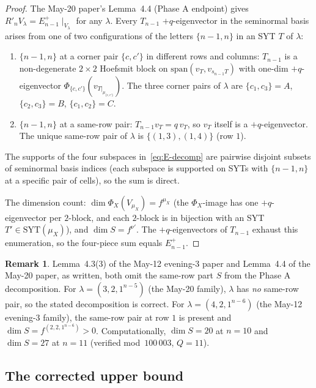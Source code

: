 \documentclass[11pt]{article}
\theoremstyle{definition}
\newtheorem{remark}[theorem]{Remark}
\begin{document}
\begin{proof}
The May-20 paper's Lemma~4.4 (Phase A endpoint) gives $R'_n V_\lambda
= E_{n-1}^+\!\mid_{V_\lambda}$ for any $\lambda$. Every $T_{n-1}$
$+q$-eigenvector in the seminormal basis arises from one of two
configurations of the letters $\{n - 1, n\}$ in an SYT $T$ of
$\lambda$:
\begin{enumerate}[label=(\arabic*),topsep=0.2em,itemsep=0.1em]
\item $\{n - 1, n\}$ at a corner pair $\{c, c'\}$ in different rows
and columns: $T_{n-1}$ is a non-degenerate $2 \times 2$ Hoefsmit block
on $\mathrm{span}(v_T, v_{s_{n-1}T})$ with one-dim $+q$-eigenvector
$\Phi_{\{c, c'\}}(v_{T|_{\mu_{\{c,c'\}}}})$. The three corner pairs
of $\lambda$ are $\{c_1, c_3\} = A$, $\{c_2, c_3\} = B$,
$\{c_1, c_2\} = C$.
\item $\{n - 1, n\}$ at a same-row pair: $T_{n-1} v_T = q\,v_T$, so
$v_T$ itself is a $+q$-eigenvector. The unique same-row pair of
$\lambda$ is $\{(1, 3), (1, 4)\}$ (row $1$).
\end{enumerate}
The supports of the four subspaces in~\eqref{eq:E-decomp} are
pairwise disjoint subsets of seminormal basis indices (each subspace
is supported on SYTs with $\{n-1, n\}$ at a specific pair of cells),
so the sum is direct.

The dimension count: $\dim \Phi_X(V_{\mu_X}) = f^{\mu_X}$ (the
$\Phi_X$-image has one $+q$-eigenvector per $2$-block, and each
$2$-block is in bijection with an SYT $T' \in \mathrm{SYT}(\mu_X)$),
and $\dim S = f^{\nu'}$. The $+q$-eigenvectors of $T_{n-1}$ exhaust
this enumeration, so the four-piece sum equals $E_{n-1}^+$.
\end{proof}

\begin{remark}\label{rem:gap}
Lemma~4.3(3) of the May-12 evening-3 paper and Lemma~4.4 of the
May-20 paper, as written, both omit the same-row part $S$ from the
Phase A decomposition. For $\lambda = (3, 2, 1^{n-5})$ (the May-20
family), $\lambda$ has \emph{no} same-row pair, so the stated
decomposition is correct. For $\lambda = (4, 2, 1^{n-6})$ (the May-12
evening-3 family), the same-row pair at row $1$ is present and
$\dim S = f^{(2, 2, 1^{n-6})} > 0$. Computationally, $\dim S = 20$
at $n = 10$ and $\dim S = 27$ at $n = 11$ (verified
mod~$100\,003$, $Q = 11$).
\end{remark}

\subsection{The corrected upper bound}\label{sec:upper}
\end{document}
